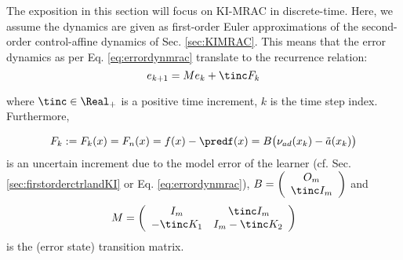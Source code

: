The exposition in this section will focus on KI-MRAC in discrete-time. Here, we assume the dynamics are given as first-order Euler approximations of the second-order control-affine dynamics of Sec. \ref{sec:KIMRAC}.
This means that the error dynamics as per Eq. \ref{eq:errordynmrac} translate to the recurrence relation:
\begin{equation}\label{eq:errordynmrac_KIMRACdiscrete}
	e_{k+1}  = M e_k + \tinc F_k
\end{equation}


where $\tinc \in \Real_+$ is a positive time increment,  $k$ is the time step index. Furthermore,

\begin{equation}
	F_k: = F_k(x) =F_n(x) = f(x) - \predf(x) = B \bigl(\nu_{ad}(x_k) -  \tilde a(x_k)\bigr) 
\end{equation}
is an uncertain increment due to the model error of the learner (cf. Sec. \ref{sec:firstorderctrlandKI} or Eq. \ref{eq:errordynmrac}), 						$B = \left(\begin{array}[h]{c}
				O_m \\ \tinc I_m
						\end{array}\right)$ and 
\begin{equation}
	M = \left(\begin{array}[h]{cc}
				I_m &  \, \tinc I_{m}\\
				-\tinc K_1 & I_m- \tinc K_2 
						\end{array}\right) 
\end{equation}
					is the (error state) transition matrix. 
					
